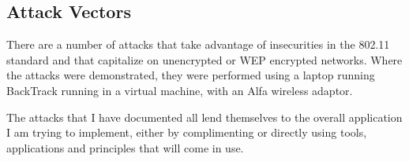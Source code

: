 \clearpage
\subsection{Attack Vectors}
There are a number of attacks that take advantage of insecurities in the 802.11 standard and that capitalize on unencrypted or WEP encrypted networks.  Where the attacks were demonstrated, they were performed using a laptop running BackTrack running in a virtual machine, with an Alfa wireless adaptor.

The attacks that I have documented all lend themselves to the overall application I am trying to implement, either by complimenting or directly using tools, applications and principles that will come in use.




